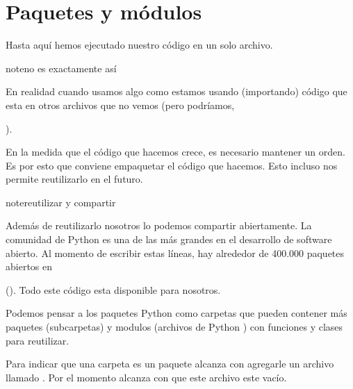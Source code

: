 \documentclass[a5paper,9pt,spanish]{sphinxmanual}
\begin{document}
\sphinxstepscope


\chapter{Paquetes y módulos}
\label{\detokenize{my-modules:paquetes-y-modulos}}\label{\detokenize{my-modules::doc}}
\sphinxAtStartPar
Hasta aquí hemos ejecutado nuestro código en un solo archivo.

\begin{sphinxadmonition}{note}{no es exactamente así}

\sphinxAtStartPar
En realidad cuando usamos algo como 
estamos usando (importando) código que esta en otros archivos que no vemos (pero
podríamos, %
\begin{footnote}[30]\sphinxAtStartFootnote
{}
%
\end{footnote}).
\end{sphinxadmonition}

\sphinxAtStartPar
En la medida que el código que hacemos crece, es necesario mantener un orden.
Es por esto que conviene empaquetar el código que hacemos. Esto incluso nos permite
reutilizarlo en el futuro.

\begin{sphinxadmonition}{note}{reutilizar y compartir}

\sphinxAtStartPar
Además de reutilizarlo nosotros lo podemos compartir
abiertamente. La comunidad de Python es una de las más grandes en el desarrollo de
software abierto. Al momento de escribir estas líneas, hay alrededor de 400.000 paquetes
abiertos en %
\begin{footnote}[31]\sphinxAtStartFootnote
{}
%
\end{footnote} (). Todo este código
esta disponible para nosotros.
\end{sphinxadmonition}

\sphinxAtStartPar
Podemos pensar a los paquetes Python como carpetas que pueden contener más paquetes
(sub\sphinxhyphen{}carpetas) y modulos (archivos de Python ) con funciones y clases para reutilizar.

\sphinxAtStartPar
Para indicar que una carpeta es un paquete alcanza con agregarle un archivo llamado
. Por el momento alcanza con que este archivo este vacío.
\end{document}
